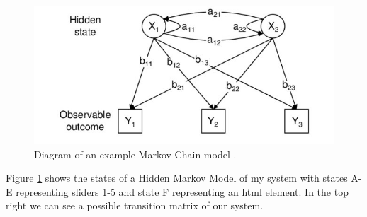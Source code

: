 \documentclass{article}
\begin{document}





\begin{figure}[ht]
    \centering
    \includegraphics[scale=1.5]{Images/HMM-Paper-Diagram.png}
    \caption{Diagram of an example Markov Chain model \cite{choudhury2007state}.}
    \label{fig:Markov}
\end{figure}

Figure \ref{fig:Markov} shows the states of a Hidden Markov Model of my system with states A-E representing sliders 1-5 and state F representing an html element.
In the top right we can see a possible transition matrix of our system.
\end{document}
